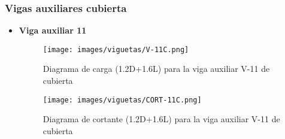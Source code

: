 \subsubsection{Vigas auxiliares cubierta}
\begin{itemize}
            
            
            
            \item \textbf{Viga auxiliar 11}\\
            \begin{figure}[H]
                \centering
                \texttt{[image: images/viguetas/V-11C.png]}
                \caption{Diagrama de carga (1.2D+1.6L) para la viga auxiliar V-11 de cubierta}
                \label{fig:W V-11 EP}
            \end{figure}
            
            \begin{figure}[H]
                \centering
                \texttt{[image: images/viguetas/CORT-11C.png]}
                \caption{Diagrama de cortante (1.2D+1.6L) para la viga auxiliar V-11 de cubierta}
                \label{fig:Cort V-11 EP}
            \end{figure}
            

\end{itemize}

